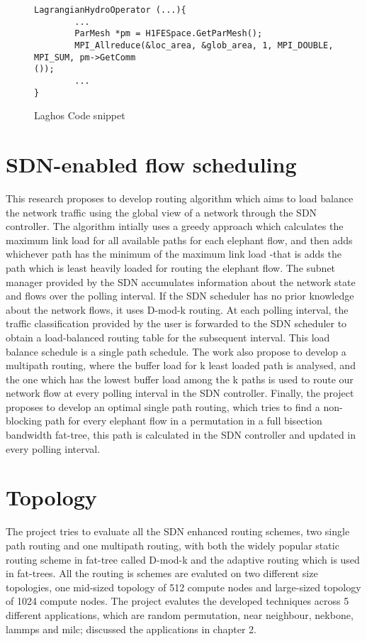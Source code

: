 \begin{figure}[hbtp]
\caption{Laghos Code snippet}
\label{code.laghos}
\begin{lstlisting}[breaklines]
LagrangianHydroOperator (...){
        ...
        ParMesh *pm = H1FESpace.GetParMesh();
        MPI_Allreduce(&loc_area, &glob_area, 1, MPI_DOUBLE, MPI_SUM, pm->GetComm
());
        ...
}
\end{lstlisting}
\end{figure}


\section{SDN-enabled flow scheduling}
This research proposes to develop routing algorithm which aims to load balance the network traffic using the 
global view of a network through the SDN controller.
The algorithm intially uses a greedy approach which calculates the maximum link load for all available
paths for each elephant flow, and then adds whichever path has the minimum of the maximum link load 
-that is adds the path which is least heavily loaded for routing the elephant flow. 
The subnet manager provided by the SDN accumulates information
about the network state and flows over the polling interval. If the SDN
scheduler has no prior knowledge about the network flows, it uses D-mod-k routing.
At each polling interval, the traffic classification provided by the user is forwarded to the SDN scheduler 
to obtain a load-balanced routing table for the subsequent interval. This load balance schedule is a single 
path schedule. The work also propose to develop a multipath routing, where the buffer load for k least loaded
path is analysed, and the one which has the lowest buffer load among the k paths is used to route our network flow at every 
polling interval in the SDN controller. Finally,
the project proposes to develop an optimal single path routing, which tries to find a non-blocking path for 
every elephant flow in a permutation in a full bisection bandwidth fat-tree, this path is calculated in the SDN controller and 
updated in every polling interval.


\section{Topology}
The project tries to evaluate all the SDN enhanced routing schemes, two single path routing and one multipath
routing, with both the widely popular static routing scheme in fat-tree called D-mod-k and the adaptive 
routing which is used in fat-trees. All the routing is schemes are evaluted on two different size
topologies, one mid-sized topology of 512 compute nodes and large-sized topology of 1024 compute
nodes. The project evalutes the developed techniques across 5 different applications, which are random permutation,
near neighbour, nekbone, lammps and milc; discussed the applications in chapter 2. 

